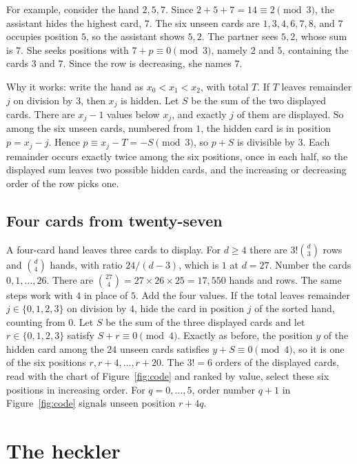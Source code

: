 \documentclass[11pt]{article}
\begin{document}
For example, consider the hand $2,5,7$. Since $2+5+7=14\equiv2\pmod3$, the assistant hides the highest card, $7$. The six unseen cards are $1,3,4,6,7,8$, and $7$ occupies position $5$, so the assistant shows $5,2$. The partner sees $5,2$, whose sum is $7$. She seeks positions with $7+p\equiv0\pmod3$, namely $2$ and $5$, containing the cards $3$ and $7$. Since the row is decreasing, she names $7$.

Why it works: write the hand as $x_0<x_1<x_2$, with total $T$. If $T$ leaves remainder $j$ on division by $3$, then $x_j$ is hidden. Let $S$ be the sum of the two displayed cards. There are $x_j-1$ values below $x_j$, and exactly $j$ of them are displayed. So among the six unseen cards, numbered from $1$, the hidden card is in position $p=x_j-j$.
Hence $p\equiv x_j-T=-S\pmod3$, so $p+S$ is divisible by $3$. Each remainder occurs exactly twice among the six positions, once in each half, so the displayed sum leaves two possible hidden cards, and the increasing or decreasing order of the row picks one.

\subsection*{Four cards from twenty-seven}

A four-card hand leaves three cards to display. For $d\geq4$ there are
$3!\binom d3$ rows and $\binom d4$ hands, with ratio $24/(d-3)$, which
is $1$ at $d=27$. Number the cards $0,1,\ldots,26$. There are
$\binom{27}{4}=27\times26\times25=17{,}550$ hands and rows. The same
steps work with $4$ in place of $5$. Add the four values. If the total
leaves remainder $j\in\{0,1,2,3\}$ on division by $4$, hide the card
in position $j$ of the sorted hand, counting from $0$. Let $S$ be the
sum of the three displayed cards and let $r\in\{0,1,2,3\}$ satisfy
$S+r\equiv0\pmod4$. Exactly as before, the position $y$ of the hidden
card among the $24$ unseen cards satisfies $y+S\equiv0\pmod4$, so it
is one of the six positions $r, r+4, \ldots, r+20$. 
The $3!=6$ orders
of the displayed cards, read with the chart of Figure~\ref{fig:code}
and ranked by value, select these six positions in increasing order. For $q=0,\ldots,5$, order number $q+1$ in
Figure~\ref{fig:code} signals unseen position $r+4q$.


\section{The heckler}
\label{sec:heckler}
\end{document}
